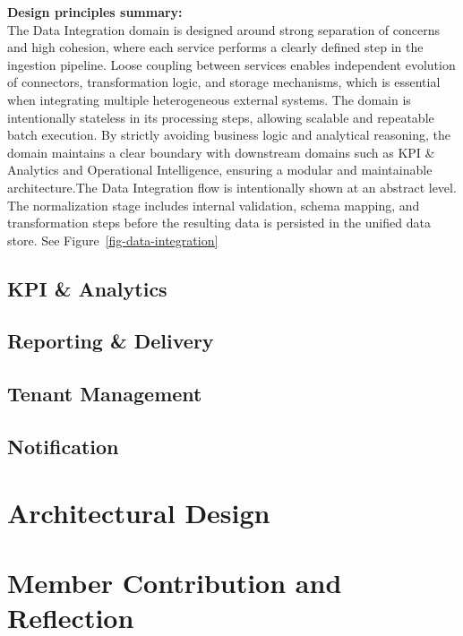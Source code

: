 \documentclass[
  letterpaper,
  DIV=11,
  numbers=noendperiod]{scrartcl}
\begin{document}
\textbf{Design principles summary:\\
}The Data Integration domain is designed around strong separation of
concerns and high cohesion, where each service performs a clearly
defined step in the ingestion pipeline. Loose coupling between services
enables independent evolution of connectors, transformation logic, and
storage mechanisms, which is essential when integrating multiple
heterogeneous external systems. The domain is intentionally stateless in
its processing steps, allowing scalable and repeatable batch execution.
By strictly avoiding business logic and analytical reasoning, the domain
maintains a clear boundary with downstream domains such as KPI \&
Analytics and Operational Intelligence, ensuring a modular and
maintainable architecture.The Data Integration flow is intentionally
shown at an abstract level. The normalization stage includes internal
validation, schema mapping, and transformation steps before the
resulting data is persisted in the unified data store. See
Figure~\ref{fig-data-integration}

\subsection{\texorpdfstring{\textbf{KPI \&
Analytics}}{KPI \& Analytics}}\label{kpi-analytics}

\subsection{\texorpdfstring{\textbf{Reporting \&
Delivery}}{Reporting \& Delivery}}\label{reporting-delivery}

\subsection{\texorpdfstring{\textbf{Tenant
Management}}{Tenant Management}}\label{tenant-management}

\subsection{\texorpdfstring{\textbf{Notification}}{Notification}}\label{notification}

\section{Architectural Design}\label{architectural-design}

\section{Member Contribution and
Reflection}\label{member-contribution-and-reflection}
\end{document}
